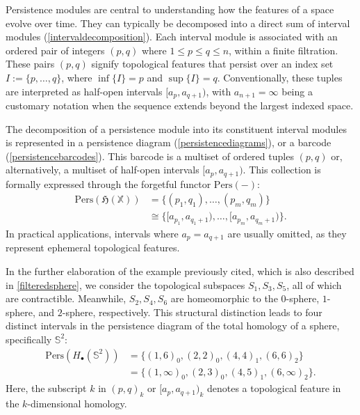 Persistence modules are central to understanding how the features of a space evolve over time. They can typically be decomposed into a direct sum of interval modules (\ref{intervaldecomposition}). Each interval module is associated with an ordered pair of integers $(p,q)$ where $1 \leq p \leq q \leq n$, within a finite filtration. These pairs $(p,q)$ signify topological features that persist over an index set $I := \{p, \ldots, q\}$, where $\inf\{I\} = p$ and $\sup\{I\} = q$. Conventionally, these tuples are interpreted as half-open intervals $[a_p, a_{q+1})$, with $a_{n+1} = \infty$ being a customary notation when the sequence extends beyond the largest indexed space.

The decomposition of a persistence module into its constituent interval modules is represented in a persistence diagram (\ref{persistencediagrams}), or a barcode (\ref{persistencebarcodes}). This barcode is a multiset of ordered tuples $(p,q)$ or, alternatively, a multiset of half-open intervals $[a_p, a_{q+1})$. This collection is formally expressed through the forgetful functor $\text{Pers}(-)$:
\begin{align}
\text{Pers}(\mathfrak{H}(\mathbb{X})) &= \{(p_1,q_1), \ldots, (p_m,q_m)\} \\
&\cong \{[a_{p_1}, a_{q_1+1}), \ldots, [a_{p_m}, a_{q_m+1})\}.
\end{align}
In practical applications, intervals where $a_p = a_{q+1}$ are usually omitted, as they represent ephemeral topological features.

\begin{example}
In the further elaboration of the example previously cited, which is also described in \ref{filteredsphere}, we consider the topological subspaces $S_1, S_3, S_5$, all of which are contractible. Meanwhile, $S_2, S_4, S_6$ are homeomorphic to the $0$-sphere, $1$-sphere, and $2$-sphere, respectively. This structural distinction leads to four distinct intervals in the persistence diagram of the total homology of a sphere, specifically $\mathbb{S}^2$:
\begin{align}
\text{Pers}(H_\bullet(\mathbb{S}^2)) &= \{(1,6)_0, (2,2)_0, (4,4)_1, (6,6)_2 \} \\
&= \{(1,\infty)_0, (2,3)_0, (4,5)_1, (6, \infty)_2 \}.
\end{align}
Here, the subscript $k$ in $(p,q)_k$ or $[a_p, a_{q+1})_k$ denotes a topological feature in the $k$-dimensional homology.
\end{example}

